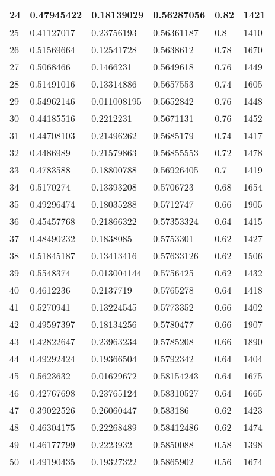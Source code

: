 \begin{longtable}{|l|l|l|l|l|l|}
24 & 0.47945422 & 0.18139029 & 0.56287056 & 0.82 & 1421 \\ \hline 
25 & 0.41127017 & 0.23756193 & 0.56361187 & 0.8 & 1410 \\ \hline 
26 & 0.51569664 & 0.12541728 & 0.5638612 & 0.78 & 1670 \\ \hline 
27 & 0.5068466 & 0.1466231 & 0.5649618 & 0.76 & 1449 \\ \hline 
28 & 0.51491016 & 0.13314886 & 0.5657553 & 0.74 & 1605 \\ \hline 
29 & 0.54962146 & 0.011008195 & 0.5652842 & 0.76 & 1448 \\ \hline 
30 & 0.44185516 & 0.2212231 & 0.5671131 & 0.76 & 1452 \\ \hline 
31 & 0.44708103 & 0.21496262 & 0.5685179 & 0.74 & 1417 \\ \hline 
32 & 0.4486989 & 0.21579863 & 0.56855553 & 0.72 & 1478 \\ \hline 
33 & 0.4783588 & 0.18800788 & 0.56926405 & 0.7 & 1419 \\ \hline 
34 & 0.5170274 & 0.13393208 & 0.5706723 & 0.68 & 1654 \\ \hline 
35 & 0.49296474 & 0.18035288 & 0.5712747 & 0.66 & 1905 \\ \hline 
36 & 0.45457768 & 0.21866322 & 0.57353324 & 0.64 & 1415 \\ \hline 
37 & 0.48490232 & 0.1838085 & 0.5753301 & 0.62 & 1427 \\ \hline 
38 & 0.51845187 & 0.13413416 & 0.57633126 & 0.62 & 1506 \\ \hline 
39 & 0.5548374 & 0.013004144 & 0.5756425 & 0.62 & 1432 \\ \hline 
40 & 0.4612236 & 0.2137719 & 0.5765278 & 0.64 & 1418 \\ \hline 
41 & 0.5270941 & 0.13224545 & 0.5773352 & 0.66 & 1402 \\ \hline 
42 & 0.49597397 & 0.18134256 & 0.5780477 & 0.66 & 1907 \\ \hline 
43 & 0.42822647 & 0.23963234 & 0.5785208 & 0.66 & 1890 \\ \hline 
44 & 0.49292424 & 0.19366504 & 0.5792342 & 0.64 & 1404 \\ \hline 
45 & 0.5623632 & 0.01629672 & 0.58154243 & 0.64 & 1675 \\ \hline 
46 & 0.42767698 & 0.23765124 & 0.58310527 & 0.64 & 1665 \\ \hline 
47 & 0.39022526 & 0.26060447 & 0.583186 & 0.62 & 1423 \\ \hline 
48 & 0.46304175 & 0.22268489 & 0.58412486 & 0.62 & 1474 \\ \hline 
49 & 0.46177799 & 0.2223932 & 0.5850088 & 0.58 & 1398 \\ \hline 
50 & 0.49190435 & 0.19327322 & 0.5865902 & 0.56 & 1674 \\ \hline 
\end{longtable}